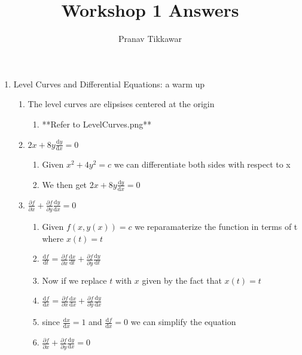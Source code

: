 \documentclass{article}
\author{Pranav Tikkawar}
\title{Workshop 1 Answers}
\begin{document}
\maketitle

\begin{enumerate}
    \item Level Curves and Differential Equations: a warm up
    \begin{enumerate}
        \item The level curves are elipsises centered at the origin
        \begin{enumerate}
            \item **Refer to LevelCurves.png**
        \end{enumerate}
        \item $ 2x + 8y \frac{\mathrm{d} y}{\mathrm{d} x} = 0 $
        \begin{enumerate}
            \item Given $x^2 +4y^2 = c$ we can differentiate both sides with respect to x
            \item We then get $ 2x + 8y \frac{\mathrm{d} y}{\mathrm{d} x} = 0 $
        \end{enumerate}
        \item $\frac{\partial f}{\partial x} + \frac{\partial f}{\partial y} \frac{\mathrm{d}y}{\mathrm{d}x} = 0$
        \begin{enumerate}
            \item Given $f(x,y(x)) = c $ we reparamaterize the function in terms of t where $x(t) = t$
            \item $\frac{\mathrm{d} f}{\mathrm{d} t}  = \frac{\partial f}{\partial x} \frac{\mathrm{d} x}{\mathrm{d} t} 
            + \frac{\partial f}{\partial y} \frac{\mathrm{d} y}{\mathrm{d} t}$
            \item Now if we replace $t$ with $x$ given by the fact that $x(t) = t$
            \item $\frac{\mathrm{d} f}{\mathrm{d} x}  = \frac{\partial f}{\partial x} \frac{\mathrm{d} x}{\mathrm{d} x} 
            + \frac{\partial f}{\partial y} \frac{\mathrm{d} y}{\mathrm{d} x}$
            \item since $\frac{\mathrm{d} x}{\mathrm{d}x} = 1$ and $ \frac  {\mathrm{d} f}{\mathrm{d} x} = 0$ we can simplify the equation
            \item $\frac{\partial f}{\partial x} + \frac{\partial f}{\partial y} \frac{\mathrm{d}y}{\mathrm{d}x} = 0$
        \end{enumerate}

\end{enumerate}
\end{enumerate}
\end{document}
